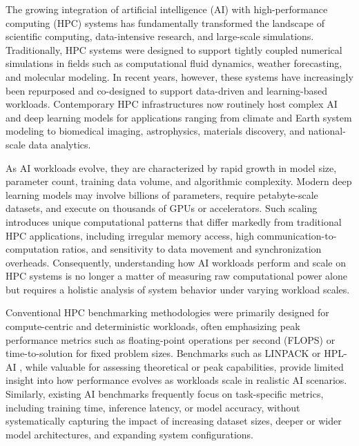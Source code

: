 \documentclass{llncs}
\begin{document}
The growing integration of artificial intelligence (AI) with high-performance computing (HPC) systems has fundamentally transformed the landscape of scientific computing, data-intensive research, and large-scale simulations. Traditionally, HPC systems were designed to support tightly coupled numerical simulations in fields such as computational fluid dynamics, weather forecasting, and molecular modeling. In recent years, however, these systems have increasingly been repurposed and co-designed to support data-driven and learning-based workloads. Contemporary HPC infrastructures now routinely host complex AI and deep learning models for applications ranging from climate and Earth system modeling to biomedical imaging, astrophysics, materials discovery, and national-scale data analytics.

As AI workloads evolve, they are characterized by rapid growth in model size, parameter count, training data volume, and algorithmic complexity. Modern deep learning models may involve billions of parameters, require petabyte-scale datasets, and execute on thousands of GPUs or accelerators. Such scaling introduces unique computational patterns that differ markedly from traditional HPC applications, including irregular memory access, high communication-to-computation ratios, and sensitivity to data movement and synchronization overheads. Consequently, understanding how AI workloads perform and scale on HPC systems is no longer a matter of measuring raw computational power alone but requires a holistic analysis of system behavior under varying workload scales.

Conventional HPC benchmarking methodologies were primarily designed for compute-centric and deterministic workloads, often emphasizing peak performance metrics such as floating-point operations per second (FLOPS) or time-to-solution for fixed problem sizes. Benchmarks such as LINPACK \cite{Dongarra2003LINPACK} or HPL-AI \cite{OakRidge2022}, while valuable for assessing theoretical or peak capabilities, provide limited insight into how performance evolves as workloads scale in realistic AI scenarios. Similarly, existing AI benchmarks frequently focus on task-specific metrics, including training time, inference latency, or model accuracy, without systematically capturing the impact of increasing dataset sizes, deeper or wider model architectures, and expanding system configurations.
\end{document}
